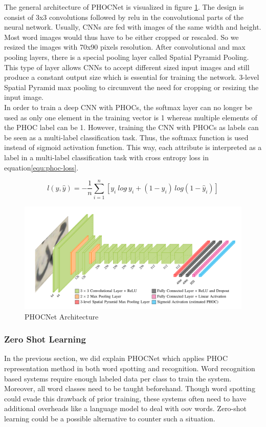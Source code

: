\noindent
The general architecture of PHOCNet is visualized in figure \ref{fig:phocnet}. The design is consist of 3x3 convolutions followed by \acrfull{relu} in the convolutional parts of the neural network. Usually, CNNs are fed with images of the same width and height. Most word images would thus have to be either cropped or rescaled. So we resized the images with 70x90 pixels resolution. After convolutional and max pooling layers, there is a special pooling layer called Spatial Pyramid Pooling. This type of layer allows CNNs to accept different sized input images and still produce a constant output size which is essential for training the network. 3-level Spatial Pyramid max pooling to circumvent the need for cropping or resizing the input image. \\

In order to train a deep CNN with PHOCs, the softmax layer can no longer be used as only one element in the training vector is 1 whereas multiple elements of the PHOC label can be 1. However, training the CNN with PHOCs as labels can be seen as a multi-label classification task. Thus, the softmax function is used instead of sigmoid activation function. This way, each attribute is interpreted as a label in a multi-label classification task with cross entropy loss in equation\ref{equ:phoc-loss}.

\begin{equation}
    l(y,\hat y) = - \frac{1}{n} \sum_{i=1}^n [y_i \: log \hat \: y_i + (1 -y_i)\, log(1-\hat y_i)]
    \label{equ:phoc-loss}
\end{equation}

\begin{figure}[!htb]
    \centering
    \includegraphics[width=16cm]{images/phocnet.PNG}
    \caption{PHOCNet Architecture}
    \label{fig:phocnet}
\end{figure}

\subsubsection{Zero Shot Learning}
In the previous section, we did explain PHOCNet which applies PHOC representation method in both word spotting and recognition. Word recognition based systems require enough labeled data per class to train the system. Moreover, all word classes need to be taught beforehand. Though word spotting could evade this drawback of prior training, these systems often need to have additional overheads like a language model to deal with \acrfull{oov} words. Zero-shot learning could be a possible alternative to counter such a situation. \\

